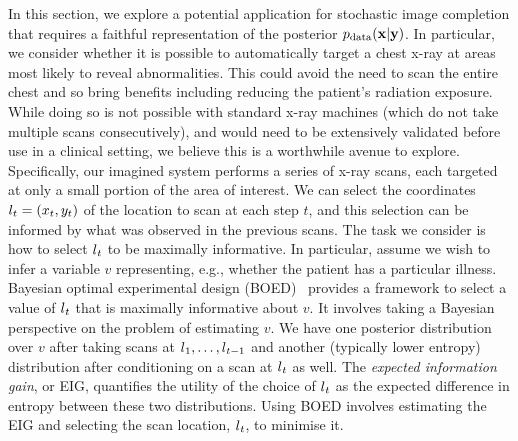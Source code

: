 In this section, we explore a potential application for stochastic image completion that
requires a faithful representation of the posterior $p_{\rm{data}}{}(\mathbf{x}{}|\mathbf{y}{})$.
%
In particular, we consider whether it is possible to automatically target a
chest x-ray at areas most likely to reveal abnormalities. This could avoid the
need to scan the entire chest and so bring benefits including reducing the
patient's radiation exposure.
%
While doing so is not possible with standard x-ray machines (which do not take
multiple scans consecutively), and would need to be extensively validated before
use in a clinical setting, we believe this is a worthwhile avenue to explore.
%
Specifically, our imagined system performs a series of x-ray scans, each
targeted at only a small portion of the area of interest. We can select the
coordinates $l_t = (x_t, y_t)$ of the location to scan at each step $t$, and
this selection can be informed by what was observed in the previous scans. The
task we consider is how to select $l{}_t$ to be maximally informative. In
particular, assume we wish to infer a variable $v$ representing, e.g., whether
the patient has a particular illness. Bayesian optimal experimental design
(BOED)~\citep{chaloner1995bayesian} provides a framework to select a value of
$l{}_t$ that is maximally informative about $v$.
%
It involves taking a Bayesian perspective on the problem of estimating $v$. We
have one posterior distribution over $v$ after taking scans at
$l{}_1,\ldots,l{}_{t-1}$ and another (typically lower entropy) distribution after
conditioning on a scan at $l{}_t$ as well.
%
The \textit{expected information gain}, or EIG, quantifies the utility of the
choice of $l{}_t$ as the expected difference in entropy between these two
distributions. Using BOED involves estimating the EIG and selecting the scan
location, $l{}_t$, to minimise it.

